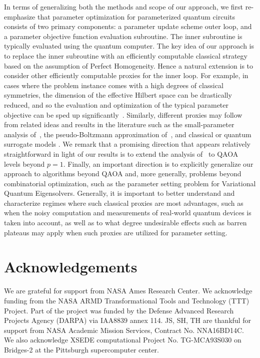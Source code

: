 \documentclass[superscriptaddress,pra,aps,10pt,longbibliography,notitlepage]{revtex4-1}
\begin{document}
In terms of generalizing both the methods and scope of our approach, we first re-emphasize that parameter optimization for parameterized quantum circuits consists of two primary components: a parameter update scheme outer loop, and a parameter objective function evaluation subroutine. The inner subroutine is typically evaluated using the quantum computer. The key idea of our approach is to replace the inner subroutine with an efficiently computable classical strategy based on the assumption of Perfect Homogeneity. Hence a natural extension is to consider other efficiently computable proxies for the inner loop. For example, in cases where the problem instance comes with a high degrees of classical symmetries, the dimension of the effective Hilbert space can be drastically reduced, and so the evaluation and optimization of the typical parameter objective can be sped up significantly~\cite{shaydulin21_symmetries}. Similarly, different proxies may follow from related ideas and results in the literature such as the small-parameter analysis of~\cite{hadfield2021analytical}, the pseudo-Boltzmann approximation of~\cite{DiezValle22}, and classical or quantum surrogate models \cite{sung2020using,shaffer22}. We remark that a promising direction that appears relatively straightforward in light of our results is to extend the analysis of~\cite{DiezValle22} to QAOA levels beyond $p=1$. Finally, an important direction is to explicitly generalize our approach to algorithms beyond QAOA and, more generally, problems beyond combinatorial optimization, such as the parameter setting problem for Variational Quantum Eigensolvers. Generally, it is important to better understand and characterize regimes where such classical proxies are most advantages, such as when the noisy computation and measurements of real-world quantum devices is taken into account, as well as to what degree undesirable effects such as barren plateaus may apply when such proxies are utilized for parameter setting. 


\section*{Acknowledgements}
We are grateful for support from NASA Ames Research Center. We acknowledge funding from the NASA ARMD Transformational Tools and Technology (TTT) Project. Part of the project was funded by the Defense Advanced Research Projects Agency (DARPA) via IAA8839 annex 114. JS, SH, TH are thankful for support from NASA Academic Mission Services, Contract No. NNA16BD14C. We also acknowledge XSEDE computational Project No. TG-MCA93S030 on  Bridges-2 at the Pittsburgh supercomputer center.

 

\onecolumngrid
\end{document}
